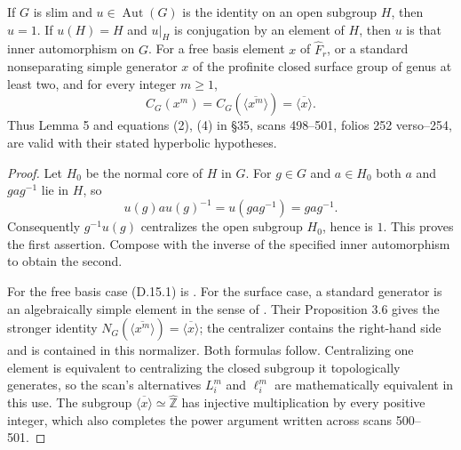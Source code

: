 If $G$ is slim and $u\in\operatorname{Aut}(G)$ is the identity on an open
subgroup $H$, then $u=1$.  If $u(H)=H$ and $u|_H$ is conjugation by an
element of $H$, then $u$ is that inner automorphism on $G$.
For a free basis element $x$ of $\widehat F_r$, or a standard nonseparating
simple generator $x$ of the profinite closed surface group of genus at least
two, and for every integer $m\geq1$,
\[
 C_G(x^m)=C_G(\overline{\langle x^m\rangle})
    =\overline{\langle x\rangle}.
 \tag{D.15.1}
\]
Thus Lemma 5 and equations (2), (4) in \S35, scans 498--501,
folios 252 verso--254, are valid with their stated hyperbolic hypotheses.
\begin{proof}
Let $H_0$ be the normal core of $H$ in $G$.  For $g\in G$ and $a\in H_0$
both $a$ and $gag^{-1}$ lie in $H$, so
\[
 u(g)a u(g)^{-1}=u(gag^{-1})=gag^{-1}.
\]
Consequently $g^{-1}u(g)$ centralizes the open subgroup $H_0$, hence is $1$.
This proves the first assertion.  Compose with the inverse of the specified
inner automorphism to obtain the second.

For the free basis case (D.15.1) is
\citet[Lemma (2.1.2)]{Nakamura1994}.
For the surface case, a standard generator is an algebraically simple element
in the sense of \citet[Definition 1.3]{BoggiZalesskii2019BC}.
Their Proposition 3.6 gives the stronger identity
$N_G(\overline{\langle x^m\rangle})=\overline{\langle x\rangle}$;
the centralizer contains the right-hand side and is contained in this
normalizer.  Both formulas follow.  Centralizing one element is equivalent
to centralizing the closed subgroup it topologically generates, so the
scan's alternatives $L_i^m$ and $\ell_i^m$ are mathematically equivalent in
this use.  The subgroup $\overline{\langle x\rangle}\simeq\widehat{\mathbb Z}$
has injective multiplication by every positive integer, which also completes
the power argument written across scans 500--501.
\end{proof}

